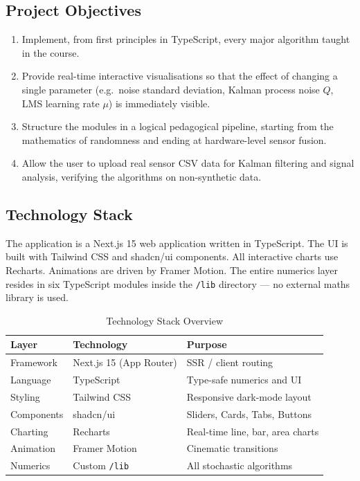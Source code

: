 \documentclass[12pt, a4paper]{article}
\begin{document}
\subsection{Project Objectives}

\begin{enumerate}[leftmargin=*, label=\arabic*.]
  \item Implement, from first principles in TypeScript, every major algorithm taught in
        the course.
  \item Provide real-time interactive visualisations so that the effect of changing a
        single parameter (e.g.\ noise standard deviation, Kalman process noise $Q$,
        LMS learning rate $\mu$) is immediately visible.
  \item Structure the modules in a logical pedagogical pipeline, starting from the
        mathematics of randomness and ending at hardware-level sensor fusion.
  \item Allow the user to upload real sensor CSV data for Kalman filtering and signal
        analysis, verifying the algorithms on non-synthetic data.
\end{enumerate}

\subsection{Technology Stack}

The application is a Next.js 15 web application written in TypeScript. The UI is built
with Tailwind CSS and shadcn/ui components. All interactive charts use Recharts.
Animations are driven by Framer Motion. The entire numerics layer resides in six
TypeScript modules inside the \texttt{/lib} directory --- no external maths library is
used.

\begin{table}[h!]
  \centering
  \caption{Technology Stack Overview}
  \begin{tabular}{lll}
    \toprule
    \textbf{Layer} & \textbf{Technology} & \textbf{Purpose} \\
    \midrule
    Framework     & Next.js 15 (App Router) & SSR / client routing \\
    Language      & TypeScript              & Type-safe numerics and UI \\
    Styling       & Tailwind CSS            & Responsive dark-mode layout \\
    Components    & shadcn/ui               & Sliders, Cards, Tabs, Buttons \\
    Charting      & Recharts                & Real-time line, bar, area charts \\
    Animation     & Framer Motion           & Cinematic transitions \\
    Numerics      & Custom \texttt{/lib}    & All stochastic algorithms \\
    \bottomrule
  \end{tabular}
\end{table}
\end{document}
